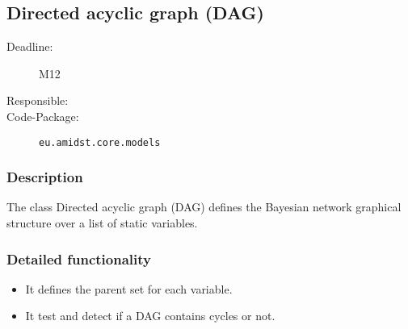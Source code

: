 \subsection{Directed acyclic graph (DAG)}
\label{Functionality:ID}

\begin{description}
\item[Deadline:] M12
\item[Responsible:]
\item[Code-Package:] \texttt{eu.amidst.core.models}
\end{description}


\subsubsection*{Description}

The class Directed acyclic graph (DAG) defines the Bayesian network graphical structure over a list of static variables.

\subsubsection*{Detailed functionality}

\begin{itemize}
\item It defines the parent set for each variable.
\item It test and detect if a DAG contains cycles or not.
\end{itemize}